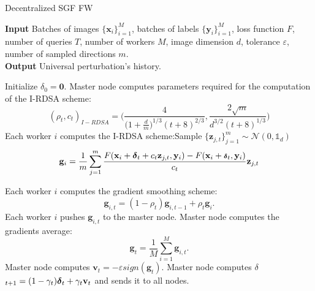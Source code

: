 \begin{algorithm}
	\caption{Decentralized SGF FW}\label{decentralized} 
	 \textbf{Input} Batches of images $\{\mathbf{x}_i\}_{i=1}^M$, batches of labels $\{\mathbf{y}_i\}_{i=1}^M$, loss function $F$, number of queries $T$, number of workers $M$, image dimension $d$, tolerance $\varepsilon$, number of sampled directions $m$.\\
	 \textbf{Output} Universal perturbation's history.
	\begin{algorithmic}[1]		
		\State Initialize \mbox{\boldmath$ \delta$}$_{0} = \mathbf{0}$.
		\State Master node computes parameters required for the computation of the I-RDSA scheme: 
		{\scriptsize\[(\rho_t,c_t)_{I-RDSA} =\bigg(\frac{4}{\big(1+\frac{d}{m}\big)^{1/3}(t+8)^{2/3}}, \frac{2\sqrt{m}}{d^{3/2}(t+8)^{1/3}}\bigg)\]}
		\State Each worker $i$ computes the I-RDSA scheme:\newline Sample $\{\mathbf{z}_{j,t}\}_{j=1}^m \sim\mathcal{N}(0,\mathbb{1}_d)$ \newline
		 \[\mathbf{g}_i = \frac{1}{m} \sum_{j=1}^{m} \frac{F(\mathbf{x}_i + \mbox{\boldmath$ \delta$}_t + c_t\mathbf{z}_{j,t}, \mathbf{y}_i) - F(\mathbf{x}_i + \mbox{\scriptsize\boldmath$ \delta$}_t, \mathbf{y}_i)}{c_t}\mathbf{z}_{j,t}\]
		
		\State Each worker $i$ computes the gradient smoothing scheme:  \[\mathbf{g}_{i,t}= (1- \rho_t)\mathbf{g}_{i,t-1} + \rho_t\mathbf{g}_i.\]
		\State Each worker $i$ pushes $\mathbf{g}_{i,t}$ to the master node.
		\State Master node computes the gradients average:
		\[\mathbf{g}_t = \frac{1}{M} \sum_{i=1}^{M} \mathbf{g}_{i,t}.\]
		\State Master node computes $\mathbf{v}_t = - \varepsilon sign(\mathbf{g}_t)$.
		\State Master node computes \mbox{\boldmath$ \delta$}$_{t+1} = (1-\gamma_t)\mbox{\boldmath$ \delta$}_t + \gamma_t\mathbf{v}_t$ and sends it to all nodes.
		\EndFor

	\end{algorithmic}
\end{algorithm}
